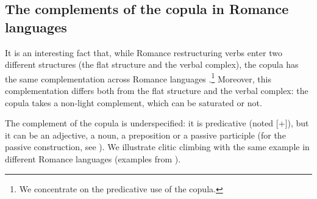{\begin{exe} 
        \label{GSexemple29}
\end{exe}

\subsection{The complements of the copula in Romance languages}\label{GSsection3.4}

It is an interesting fact that, while Romance restructuring verbs enter two different structures (the flat structure and the verbal complex), the copula has the same complementation across Romance languages \citep{abeille2001varieties, AG2010}.\footnote{We concentrate on the predicative use of the copula.} Moreover, this complementation differs both from the flat structure and the verbal complex: the copula takes a non-light complement, which can be saturated or not. 

The complement of the copula is underspecified: it is predicative (noted [\prd +]), but it can be an adjective, a noun, a preposition or a passive participle (for the passive construction, see \citealt{AG2002b-u}). We illustrate clitic climbing with the same example in different Romance languages (examples from \citealt[120]{AG2010}).

\eal
	\label{GSexemple30} 
	\label{GSexemple30a}

	\label{GSexemple30b}
		
	\label{GSexemple30c}
		
	\label{GSexemple30d}
		
}
